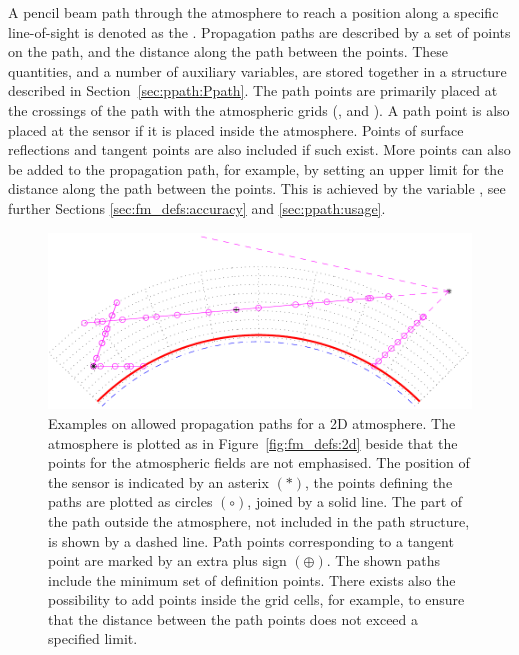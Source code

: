 A pencil beam path through the atmosphere to reach a position along a specific
line-of-sight is denoted as the . Propagation paths
are described by a set of points on the path, and the distance along the path
between the points. These quantities, and a number of auxiliary variables, are
stored together in a structure described in Section~\ref{sec:ppath:Ppath}. The
path points are primarily placed at the crossings of the path with the
atmospheric grids (,  and
). A path point is also placed at the sensor if it is
placed inside the atmosphere. Points of surface reflections and tangent points
are also included if such exist. More points can also be added to the
propagation path, for example, by setting an upper limit for the distance along
the path between the points. This is achieved by the variable
, see further Sections \ref{sec:fm_defs:accuracy} and
\ref{sec:ppath:usage}.

\begin{figure}
 \begin{center}
  \includegraphics*[width=0.95\hsize]{ppath_cases2}
  \caption{Examples on allowed propagation paths for a 2D atmosphere. 
    The atmosphere is plotted as in Figure~\ref{fig:fm_defs:2d} beside
    that the points for the atmospheric fields are not emphasised.
    The position of the sensor is indicated by an asterix $(\ast)$,
    the points defining the paths are plotted as circles $(\circ)$,
    joined by a solid line. The part of the path outside the
    atmosphere, not included in the path structure, is shown by a
    dashed line. Path points corresponding to a tangent point are
    marked by an extra plus sign $(\oplus)$. The shown paths include
    the minimum set of definition points. There exists also the
    possibility to add points inside the grid cells, for example, to
    ensure that the distance between the path points does not exceed
    a specified limit.}
  \label{fig:fm_defs:ppath_cases2}
 \end{center}
\end{figure}

